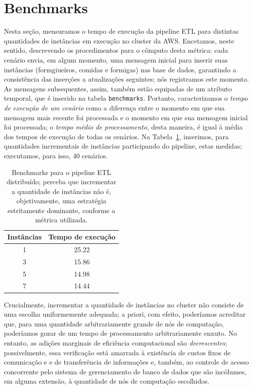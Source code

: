 \documentclass[12pt,oneside,a4paper]{article}
\begin{document}
\appendix 

\section{Benchmarks} 

Nesta seção, mensuramos o tempo de execução da pipeline ETL para distintas quantidades de instâncias em execução no cluster da AWS. Encetamos, neste sentido, descrevendo os procedimentos para o cômputo desta métrica: cada cenário envia, em algum momento, uma mensagem inicial para inserir suas instâncias (formgiueiros, comidas e formigas) nas base de dados, garantindo a consistência das inserções a atualizações seguintes; nós registramos este momento. As mensagens subsequentes, assim, também estão equipadas de um atributo temporal, que é inserido na tabela \texttt{benchmarks}. Portanto, caracterizamos o \textit{tempo de execução de um cenário} como a diferença entre o momento em que sua mensagem mais recente foi processada e o momento em que sua mensagem inicial foi processada; o \textit{tempo médio de processamento}, desta maneira, é igual à média dos tempos de execução de todas os cenários. Na Tabela~\ref{tab:benchmarks}, inserimos, para quantidades incrementais de instâncias participando do pipeline, estas medidas; executamos, para isso, 40 cenários.     

\begin{table} 
	\centering 
	\begin{tabular}{c | c} 
		Instâncias & Tempo de execução \\
		\hline 
		1 & 25.22 \\ 
		3 & 15.86 \\ 
		5 & 14.98 \\ 
		7 & 14.44 \\ 
		\hline 
	\end{tabular}
	\caption{Benchmarks para o pipeline ETL distribuído; perceba que incrementar a quantidade de instâncias não é, objetivamente, uma estratégia estritamente dominante, conforme a métrica utilizada.} 
	\label{tab:benchmarks} 
\end{table} 

Crucialmente, incrementar a quantidade de instâncias no cluster não consiste de uma escolha uniformemente adequada; a priori, com efeito, poderíamos acreditar que, para uma quantidade arbitrariamente grande de nós de computação, poderíamos gozar de um tempo de processamento arbitrariamente enxuto. No entanto, as adições marginais de eficiência computacional são \textit{decrescentes}; possivelmente, essa verificação está amarrada à existência de custos fixos de comunicação e e de transferência de informações e, também, ao controle de acesso concorrente pelo sistema de gerenciamento de banco de dados que são incólumes, em alguma extensão, à quantidade de nós de computação escolhidos. 
\end{document}

